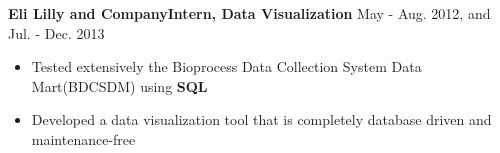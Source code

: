 \documentclass[10.5pt]{res} %
\begin{document}
\begin{resume}
    \textbf{Eli Lilly and Company}\quad\quad \textbf{Intern, Data Visualization  %
    }\hfill May - Aug. 2012, and Jul. - Dec. 2013
    \begin{itemize} pt
    	\item Tested extensively the Bioprocess Data Collection System Data Mart(BDCSDM) using \textbf{SQL} %
    	\item  Developed a data visualization tool that is completely database driven and maintenance-free %

\end{itemize}
\end{resume}
\end{document}
